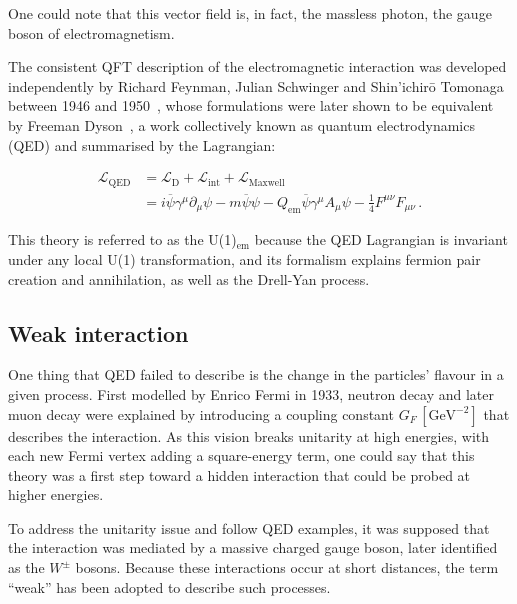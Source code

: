 One could note that this vector field is, in fact, the massless photon, the gauge boson of electromagnetism. 

\vspace{0.5 cm}

The consistent QFT description of the electromagnetic interaction was developed independently by Richard Feynman, Julian Schwinger and Shin'ichir\={o} Tomonaga between 1946 and 1950~\cite{Tomonaga:1946eb, Schwinger:1948iu, Feynman:1949zx}, whose formulations were later shown to be equivalent by Freeman Dyson~\cite{Dyson:1949bp}, a work collectively known as quantum electrodynamics (QED) and summarised by the Lagrangian:

\begin{equation}
\begin{split}
    \mathcal{L}_{\mathrm{QED}} 
    &= \mathcal{L}_{\mathrm{D}} + \mathcal{L}_{\mathrm{int}} + \mathcal{L}_{\mathrm{Maxwell}} \\
    &= i \overline{\psi}\gamma^\mu \partial_\mu \psi 
    - m \overline{\psi} \psi 
    - Q_\mathrm{em} \overline{\psi} \gamma^\mu A_\mu \psi 
    -\frac{1}{4}F^{\mu\nu}F_{\mu\nu} \, .
\end{split}
\end{equation}

This theory is referred to as the U(1)$_\mathrm{em}$ because the QED Lagrangian is invariant under any local U(1) transformation, and its formalism explains fermion pair creation and annihilation, as well as the Drell-Yan process.


\subsection{Weak interaction}

One thing that QED failed to describe is the change in the particles' flavour in a given process. First modelled by Enrico Fermi in 1933, neutron decay and later muon decay were explained by introducing a coupling constant $G_F\, \mathrm{[GeV^{-2}]}$ that describes the interaction. As this vision breaks unitarity at high energies, with each new Fermi vertex adding a square-energy term, one could say that this theory was a first step toward a hidden interaction that could be probed at higher energies.

To address the unitarity issue and follow QED examples, it was supposed that the interaction was mediated by a massive charged gauge boson, later identified as the $W^\pm$ bosons. Because these interactions occur at short distances, the term ``weak'' has been adopted to describe such processes.

